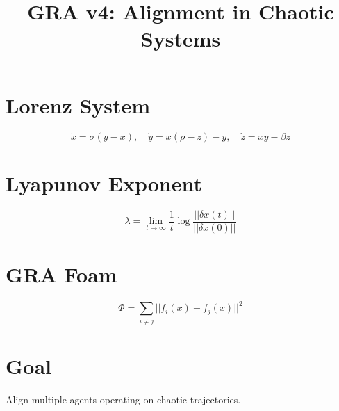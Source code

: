 \documentclass{article}
\title{GRA v4: Alignment in Chaotic Systems}
\author{}
\date{}
\begin{document}
\maketitle

\section{Lorenz System}

\[
\dot{x} = \sigma(y - x), \quad
\dot{y} = x(\rho - z) - y, \quad
\dot{z} = xy - \beta z
\]

\section{Lyapunov Exponent}

\[
\lambda = \lim_{t \to \infty} \frac{1}{t} \log \frac{||\delta x(t)||}{||\delta x(0)||}
\]

\section{GRA Foam}

\[
\Phi = \sum_{i \neq j} ||f_i(x) - f_j(x)||^2
\]

\section{Goal}

Align multiple agents operating on chaotic trajectories.
\end{document}
